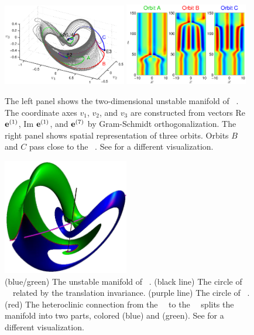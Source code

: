 \begin{figure}[h]
\begin{center}
\includegraphics[width=0.48\textwidth]{figs/ks22_E2_manifold.eps}%
\includegraphics[width=0.48\textwidth]{figs/ks22_E2_orbits.eps}
\end{center}
\caption{
The left panel shows the two-dimensional
unstable manifold of \eqv\ . The coordinate axes
$v_1$, $v_2$, and $v_3$ are constructed from vectors
Re ${\mathbf e}^{(1)}$, Im ${\mathbf e}^{(1)}$, and ${\mathbf e}^{(7)}$ by Gram-Schmidt orthogonalization.
The right panel shows spatial representation of three orbits. Orbits
$B$ and $C$ pass close to the \eqv\ . See 
 for a different visualization.
       }
\label{f:KS22E2man}
\end{figure}


\begin{figure}[t]
\begin{center} 
\includegraphics[height=2in]{figs/ks22manifold1.eps}
\end{center}
\caption{
    (blue/green) The unstable manifold of ~\eqv.
    (black line) The circle of ~\eqva\ 
related by the translation invariance. 
(purple line) The circle  of ~\eqva.
(red) The heteroclinic connection 
from the ~\eqv\ to the ~\eqv\ splits 
the manifold into two parts, 
colored (blue) and (green).  See 
 for a different visualization.
        }
\label{f:KS22Manifold}
\end{figure}


